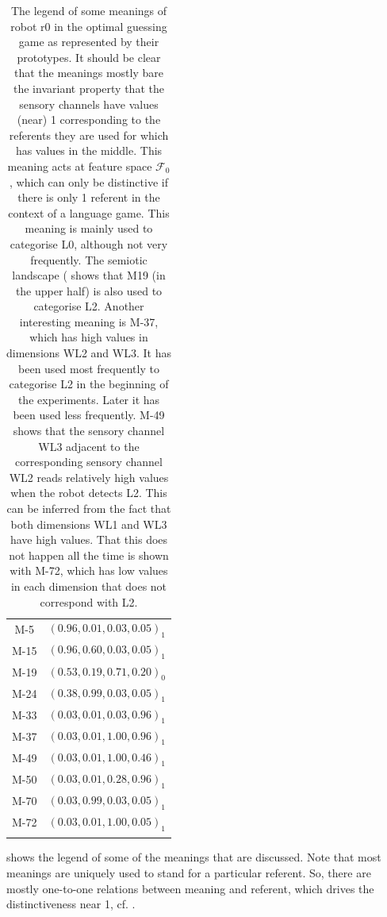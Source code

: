 \begin{table}
\centering
\begin{tabular}{cc}
\lsptoprule
M-5 & $(0.96,0.01,0.03,0.05)_1$\\%
M-15 & $(0.96,0.60,0.03,0.05)_1$\\%
M-19 & $(0.53,0.19,0.71,0.20)_0$\\%
M-24 & $(0.38,0.99,0.03,0.05)_1$\\%
M-33 & $(0.03,0.01,0.03,0.96)_1$\\%
M-37 & $(0.03,0.01,1.00,0.96)_1$\\%
M-49 & $(0.03,0.01,1.00,0.46)_1$\\%
M-50 & $(0.03,0.01,0.28,0.96)_1$\\%
M-70 & $(0.03,0.99,0.03,0.05)_1$\\%
M-72 & $(0.03,0.01,1.00,0.05)_1$\\%
\lspbottomrule
\end{tabular}
\caption{The legend of some meanings of robot r0 in the optimal guessing game as represented by their prototypes. It should be clear that the meanings mostly bare the invariant property that the sensory channels have values (near) 1 corresponding to the referents they are used for which has values in the middle. This meaning acts at feature space ${\mathcal F}_0$, which can only be distinctive if there is only 1 referent in the context of a language game. This meaning is mainly used to categorise L0, although not very frequently. The semiotic landscape ( shows that M19 (in the upper half) is also used to categorise L2. Another interesting meaning is M-37, which has high values in dimensions WL2 and WL3. It has been used most frequently to categorise L2 in the beginning of the experiments. Later it has been used less frequently. M-49 shows that the sensory channel WL3 adjacent to the corresponding sensory channel WL2 reads relatively high values when the robot detects L2. This can be inferred from the fact that both dimensions WL1 and WL3 have high values. That this does not happen all the time is shown with M-72, which has low values in each dimension that does not correspond with L2.}
\label{t:opt:legend}
\end{table}

 shows the legend of some of the meanings that are discussed. Note that most meanings are uniquely used to stand for a particular referent. So, there are mostly one-to-one relations between meaning and referent, which drives the distinctiveness near 1, cf. .

